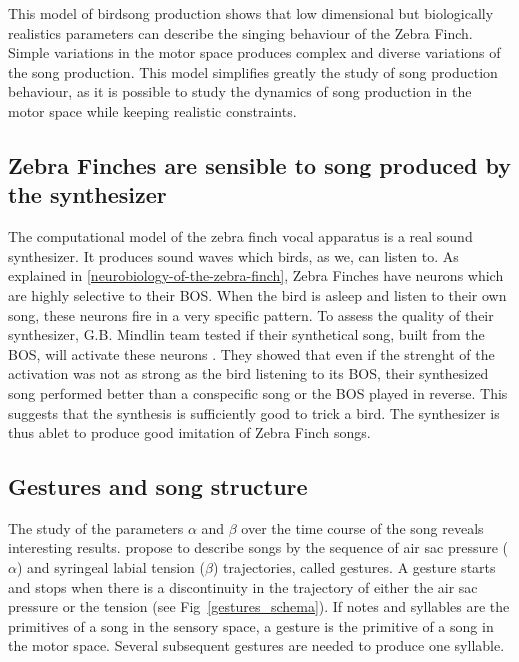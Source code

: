 \documentclass{report}
\begin{document}
This model of birdsong production shows that low dimensional but biologically
realistics parameters can describe the singing behaviour of the Zebra Finch.
Simple variations in the motor space produces complex and diverse variations of
the song production. This model simplifies greatly the study of song production
behaviour, as it is possible to study the dynamics of song production in the
motor space while keeping realistic constraints.

\subsection{Zebra Finches are sensible to song produced by the synthesizer}
\label{zebra-finches-are-sensible-to-song-produced-by-the-synthesizer}

The computational model of the zebra finch vocal apparatus is a real sound
synthesizer. It produces sound waves which birds, as we, can listen to. As
explained in \ref{neurobiology-of-the-zebra-finch}, Zebra Finches have neurons
which are highly selective to their BOS. When the bird is asleep and listen to
their own song, these neurons fire in a very specific pattern. To assess the
quality of their synthesizer, G.B. Mindlin team tested if their synthetical
song, built from the BOS, will activate these neurons
\parencite{amador_low_2014, boari_automatic_2015}. They showed that even if the
strenght of the activation was not as strong as the bird listening to its BOS,
their synthesized song performed better than a conspecific song or the BOS
played in reverse. This suggests that the synthesis is sufficiently good to
trick a bird. The synthesizer is thus ablet to produce good imitation of Zebra
Finch songs.

\subsection{Gestures and song structure} \label{gestures-and-song-structure}

The study of the parameters \(\alpha\) and \(\beta\) over the time course of the
song reveals interesting results. \textcite{amador_elemental_2013} propose to
describe songs by the sequence of air sac pressure (\(\alpha\)) and syringeal
labial tension (\(\beta\)) trajectories, called gestures. A gesture starts and
stops when there is a discontinuity in the trajectory of either the air sac
pressure or the tension (see Fig~\ref{gestures_schema}). If notes and syllables
are the primitives of a song in the sensory space, a gesture is the primitive of
a song in the motor space. Several subsequent gestures are needed to produce one
syllable.
\end{document}
